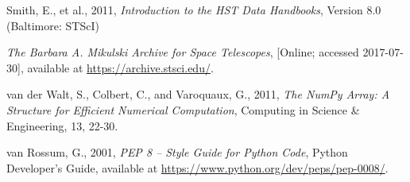\documentclass[10pt,journal,compsoc]{IEEEtran}
\begin{document}
\begin{thebibliography}{1}
Smith, E., et al., 2011, \emph{Introduction to the HST Data Handbooks}, Version 8.0 (Baltimore: STScI)

\emph{The Barbara A. Mikulski Archive for Space Telescopes}, [Online; accessed 2017-07-30],
available at \url{https://archive.stsci.edu/}.

van der Walt, S., Colbert, C., and Varoquaux, G., 2011, \emph{The NumPy Array: A Structure for
Efficient Numerical Computation}, Computing in Science \& Engineering, 13, 22-30.

van Rossum, G., 2001, \emph{PEP 8 -- Style Guide for Python Code}, Python Developer's Guide,
available at \url{https://www.python.org/dev/peps/pep-0008/}.

\end{thebibliography}


\end{document}
